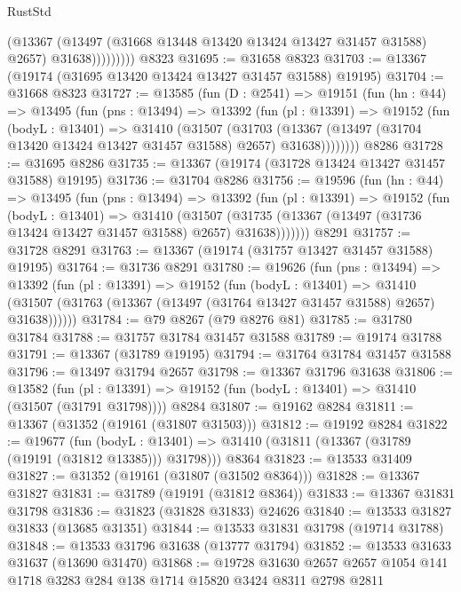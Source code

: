 \begin{lexlean}{RustStd}
\begin{coremodule}
                    (@13367
                      (@13497 (@31668 @13448 @13420 @13424 @13427 @31457 @31588) @2657)
                      @31638)))))))))
    @8323
@31695 := @31658 @8323
@31703 := @13367 (@19174 (@31695 @13420 @13424 @13427 @31457 @31588) @19195)
@31704 := @31668 @8323
@31727 := @13585
    (fun (D : @2541) =>
    @19151
      (fun (hn : @44) =>
      @13495
        (fun (pns : @13494) =>
        @13392
          (fun (pl : @13391) =>
          @19152
            (fun (bodyL : @13401) =>
            @31410
              (@31507
                (@31703
                  (@13367 (@13497 (@31704 @13420 @13424 @13427 @31457 @31588) @2657) @31638))))))))
    @8286
@31728 := @31695 @8286
@31735 := @13367 (@19174 (@31728 @13424 @13427 @31457 @31588) @19195)
@31736 := @31704 @8286
@31756 := @19596
    (fun (hn : @44) =>
    @13495
      (fun (pns : @13494) =>
      @13392
        (fun (pl : @13391) =>
        @19152
          (fun (bodyL : @13401) =>
          @31410
            (@31507
              (@31735 (@13367 (@13497 (@31736 @13424 @13427 @31457 @31588) @2657) @31638)))))))
    @8291
@31757 := @31728 @8291
@31763 := @13367 (@19174 (@31757 @13427 @31457 @31588) @19195)
@31764 := @31736 @8291
@31780 := @19626
    (fun (pns : @13494) =>
    @13392
      (fun (pl : @13391) =>
      @19152
        (fun (bodyL : @13401) =>
        @31410 (@31507 (@31763 (@13367 (@13497 (@31764 @13427 @31457 @31588) @2657) @31638))))))
@31784 := @79 @8267 (@79 @8276 @81)
@31785 := @31780 @31784
@31788 := @31757 @31784 @31457 @31588
@31789 := @19174 @31788
@31791 := @13367 (@31789 @19195)
@31794 := @31764 @31784 @31457 @31588
@31796 := @13497 @31794 @2657
@31798 := @13367 @31796 @31638
@31806 := @13582
    (fun (pl : @13391) => @19152 (fun (bodyL : @13401) => @31410 (@31507 (@31791 @31798))))
    @8284
@31807 := @19162 @8284
@31811 := @13367 (@31352 (@19161 (@31807 @31503)))
@31812 := @19192 @8284
@31822 := @19677
    (fun (bodyL : @13401) => @31410 (@31811 (@13367 (@31789 (@19191 (@31812 @13385))) @31798)))
    @8364
@31823 := @13533 @31409
@31827 := @31352 (@19161 (@31807 (@31502 @8364)))
@31828 := @13367 @31827
@31831 := @31789 (@19191 (@31812 @8364))
@31833 := @13367 @31831 @31798
@31836 := @31823 (@31828 @31833) @24626
@31840 := @13533 @31827 @31833 (@13685 @31351)
@31844 := @13533 @31831 @31798 (@19714 @31788)
@31848 := @13533 @31796 @31638 (@13777 @31794)
@31852 := @13533 @31633 @31637 (@13690 @31470)
@31868 := @19728
    @31630
    @2657
    @2657
    @1054
    @141
    @1718
    @3283
    @284
    @138
    @1714
    @15820
    @3424
    @8311
    @2798
    @2811

\end{coremodule}
\end{lexlean}
